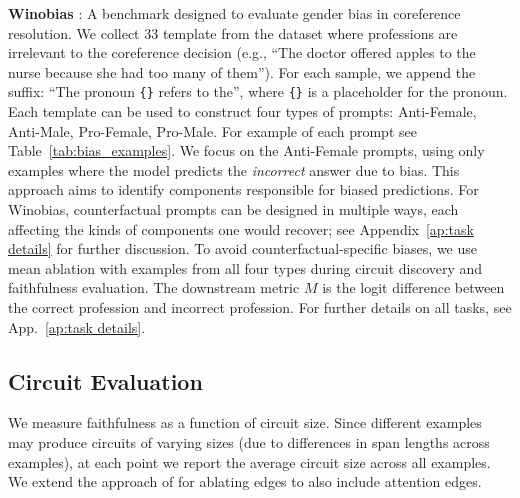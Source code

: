 \textbf{Winobias} \citep{zhao2018gender}: 
A benchmark designed to evaluate gender bias in coreference resolution.
We collect 33 template from the dataset where professions are irrelevant to the coreference decision (e.g., ``The doctor offered apples to the nurse because she had too many of them'').
For each sample, we append the suffix: ``The pronoun \texttt{\{\}} refers to the'', where \texttt{\{\}} is a placeholder for the pronoun.
Each template can be used to construct four types of prompts: Anti-Female, Anti-Male, Pro-Female, Pro-Male. For example of each prompt see Table~\ref{tab:bias_examples}. We focus on the Anti-Female prompts, using only examples where the model predicts the \emph{incorrect} answer due to bias. This approach aims to identify components responsible for biased predictions. For Winobias, counterfactual prompts can be designed in multiple ways, each affecting the kinds of components one would recover; see Appendix~\ref{ap:task details} for further discussion. To avoid counterfactual-specific biases, we use mean ablation with examples from all four types during circuit discovery and faithfulness evaluation. The downstream metric $M$ is the logit difference between the correct profession and incorrect profession.
For further details on all tasks, see App.~\ref{ap:task details}.

\subsection{Circuit Evaluation}  
We measure faithfulness as a function of circuit size. Since different examples may produce circuits of varying sizes (due to differences in span lengths across examples), at each point we report the average circuit size across all examples. We extend the approach of \citet{hanna2024have} for ablating edges to also include attention edges. 

